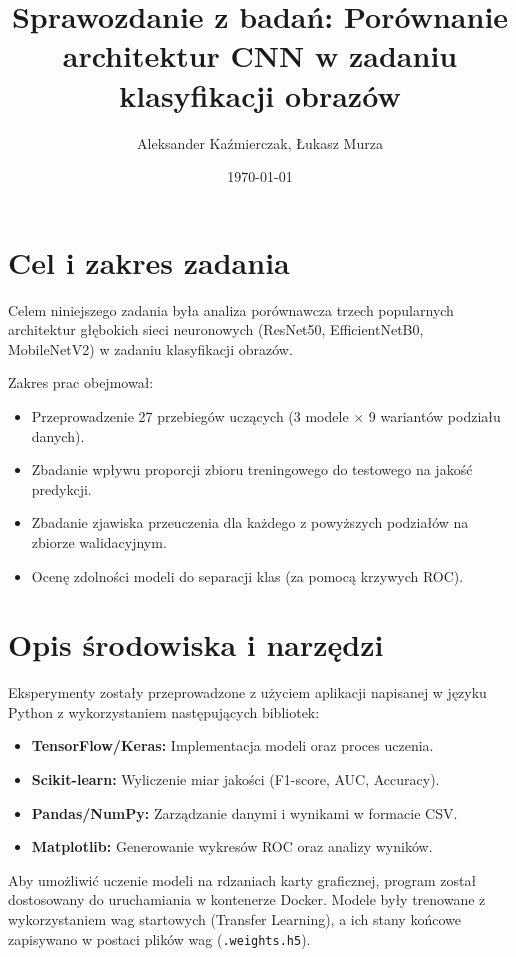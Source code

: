 \documentclass[12pt,a4paper]{article}
\title{Sprawozdanie z badań: Porównanie architektur CNN w zadaniu klasyfikacji obrazów}
\author{Aleksander Kaźmierczak, Łukasz Murza}
\date{\today}
\begin{document}
\maketitle
\tableofcontents
\newpage

\section{Cel i zakres zadania}
Celem niniejszego zadania była analiza porównawcza trzech popularnych architektur głębokich sieci neuronowych (ResNet50, EfficientNetB0, MobileNetV2) w zadaniu klasyfikacji obrazów. 

Zakres prac obejmował:
\begin{itemize}
    \item Przeprowadzenie 27 przebiegów uczących (3 modele $\times$ 9 wariantów podziału danych).
    \item Zbadanie wpływu proporcji zbioru treningowego do testowego na jakość predykcji.
    \item Zbadanie zjawiska przeuczenia dla każdego z powyższych podziałów na zbiorze walidacyjnym.
    \item Ocenę zdolności modeli do separacji klas (za pomocą krzywych ROC).
\end{itemize}

\section{Opis środowiska i narzędzi}
Eksperymenty zostały przeprowadzone z użyciem aplikacji napisanej w języku Python z wykorzystaniem następujących bibliotek:
\begin{itemize}
    \item \textbf{TensorFlow/Keras:} Implementacja modeli oraz proces uczenia.
    \item \textbf{Scikit-learn:} Wyliczenie miar jakości (F1-score, AUC, Accuracy).
    \item \textbf{Pandas/NumPy:} Zarządzanie danymi i wynikami w formacie CSV.
    \item \textbf{Matplotlib:} Generowanie wykresów ROC oraz analizy wyników.
\end{itemize}
Aby umożliwić uczenie modeli na rdzaniach karty graficznej, program został dostosowany do uruchamiania w kontenerze Docker.
Modele były trenowane z wykorzystaniem wag startowych (Transfer Learning), a ich stany końcowe zapisywano w postaci plików wag (\texttt{.weights.h5}).
\end{document}
